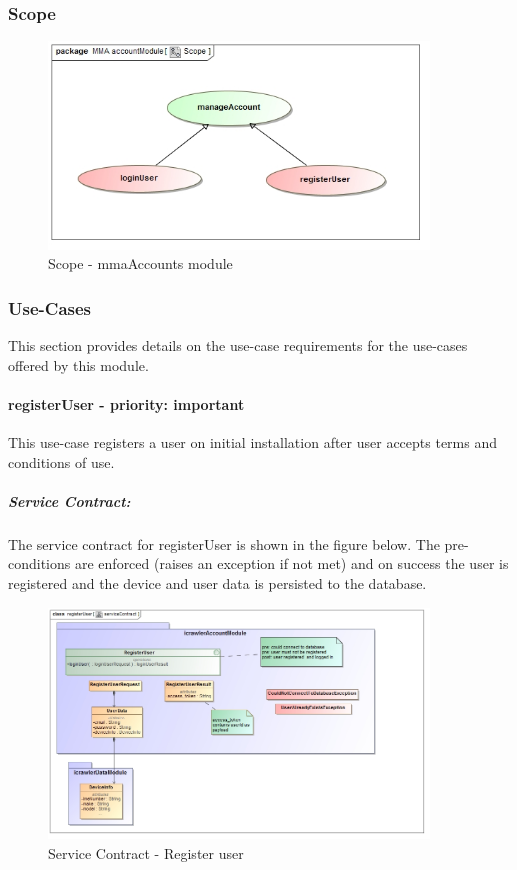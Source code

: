 \documentclass[hidelinks, 12pt, oneside]{article}
\begin{document}
	\subsubsection{Scope}
	
	\begin{figure}[!htbp]
    		\centering
    		\includegraphics[width=0.9\textwidth]{img/scopeAccounts.jpg}
    		\caption{Scope - mmaAccounts module}
    		\label{fig:accountsScope}
		\end{figure}
		
	\subsubsection{Use-Cases}
		This section provides details on the use-case requirements for the use-cases offered by this module.
	\paragraph{registerUser - priority: important}
		This use-case registers a user on initial installation after user accepts terms and conditions of use.
	
	\newpage
	\subparagraph{Service Contract:}
		The service contract for registerUser is shown in the figure below. The pre-conditions are enforced (raises an exception if not met) and on
		success the user is registered and the device and user data is persisted to the database.
		
		\begin{figure}[!htbp]
    		\centering
    		\includegraphics[width=0.9\textwidth]{img/serviceContractRegisterUser.jpg}
    		\caption{Service Contract - Register user}
    		\label{fig:ServiceCon_registerUser}
		\end{figure}
		
\end{document}
